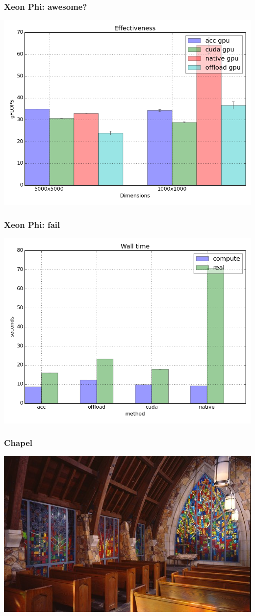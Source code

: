 \documentclass{beamer}
\begin{document}
\begin{frame}
 \frametitle{Xeon Phi: awesome?}
 \includegraphics[width=\textwidth]{bonus_effectivness.png}
\end{frame}

\begin{frame}
 \frametitle{Xeon Phi: fail}
 \includegraphics[width=\textwidth]{bonus_realvscompute.png}
\end{frame}

\begin{frame}
 \frametitle{Chapel}
 \includegraphics[width=\textwidth]{chapel.jpg}
\end{frame}
 
\end{document}
